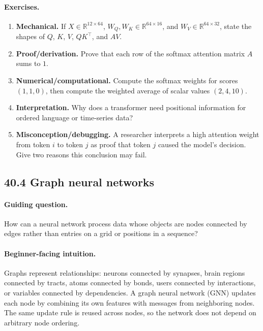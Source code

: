 \paragraph{Exercises.}
\begin{enumerate}[label=\textbf{40.3.\arabic*.}, leftmargin=*]
\item \textbf{Mechanical.} If \(X\in\mathbb{R}^{12\times64}\), \(W_Q,W_K\in\mathbb{R}^{64\times16}\), and \(W_V\in\mathbb{R}^{64\times32}\), state the shapes of \(Q\), \(K\), \(V\), \(QK^\top\), and \(AV\).
\item \textbf{Proof/derivation.} Prove that each row of the softmax attention matrix \(A\) sums to \(1\).
\item \textbf{Numerical/computational.} Compute the softmax weights for scores \((1,1,0)\), then compute the weighted average of scalar values \((2,4,10)\).
\item \textbf{Interpretation.} Why does a transformer need positional information for ordered language or time-series data?
\item \textbf{Misconception/debugging.} A researcher interprets a high attention weight from token \(i\) to token \(j\) as proof that token \(j\) caused the model's decision. Give two reasons this conclusion may fail.
\end{enumerate}

\subsection{40.4 Graph neural networks}

\paragraph{Guiding question.}
How can a neural network process data whose objects are nodes connected by edges rather than entries on a grid or positions in a sequence?

\paragraph{Beginner-facing intuition.}
Graphs represent relationships: neurons connected by synapses, brain regions connected by tracts, atoms connected by bonds, users connected by interactions, or variables connected by dependencies. A graph neural network (GNN) updates each node by combining its own features with messages from neighboring nodes. The same update rule is reused across nodes, so the network does not depend on arbitrary node ordering.

